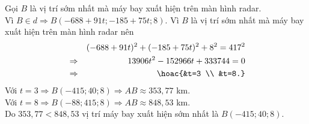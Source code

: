 \begin{ex}
{		Gọi $B$ là vị trí sớm nhất mà máy bay xuất hiện trên màn hình radar. \\
		Vì $B \in d \Rightarrow B(-688+91 t ;-185+75 t ; 8)$.
		Vì $B$ là vị trí sớm nhất mà máy bay xuất hiện trên màn hình radar nên
		\begin{eqnarray*}
			&&(-688+91 t)^2+(-185+75 t)^2+8^2=417^2\\
			&\Rightarrow &13906 t^2-152966 t+333744=0\\
			&\Rightarrow &\hoac{&t=3 \\
				&t=8.}
		\end{eqnarray*}
		Với $t=3 \Rightarrow B(-415 ; 40 ; 8) \Rightarrow A B \approx 353{,}77$ km. \\
		Với $t=8 \Rightarrow B(-88 ; 415 ; 8) \Rightarrow A B \approx 848{,}53$ km.\\
		Do $353{,}77<848{,}53$ vị trí máy bay xuất hiện sớm nhất là $B(-415 ; 40 ; 8)$.
		
	}
\end{ex}

